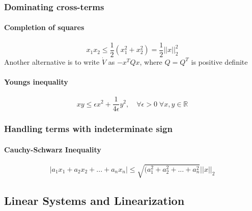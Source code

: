 \documentclass{article}
\begin{document}
\subsubsection{Dominating cross-terms}
\paragraph{Completion of squares}
\begin{equation*}
	x_1x_2 \leq \frac{1}{2}(x_1^2 + x_2^2) = \frac{1}{2} ||x||^2_2
\end{equation*}
Another alternative is to write $\dot V$ as $-x^TQx$, where $Q=Q^T$ is positive definite
\paragraph{Youngs inequality}
\begin{equation*}
	xy \leq \epsilon x^2 + \frac{1}{4\epsilon}y^2, \quad \forall \epsilon > 0 \; \forall x,y \in \mathbb{R}
\end{equation*}
\subsubsection{Handling terms with indeterminate sign}
\paragraph{Cauchy-Schwarz Inequality}
\begin{equation*}
	|a_1x_1+a_2x_2+...+a_nx_n|\leq\sqrt{(a_1^2+a_2^2+...+a_n^2}||x||_2
\end{equation*}
\subsection{Linear Systems and Linearization}
\end{document}

